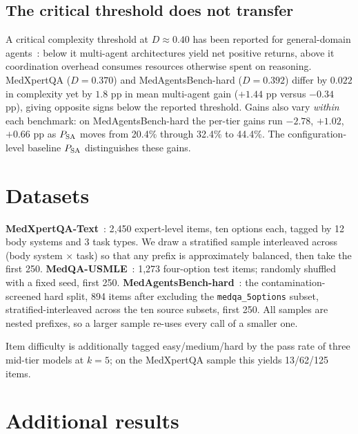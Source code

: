 \begin{table}[t]\centering\small
\caption{\textbf{Domain complexity of the three benchmarks.} Bold $D$ averages the performance ceiling, relative spread and best-model baseline; mean multi-agent gain is in pp.}
\label{tab:complexity}

\end{table}

\subsection{The critical threshold does not transfer}
A critical complexity threshold at $D \approx 0.40$ has been reported for general-domain
agents~\citep{kim2026scaling}: below it
multi-agent architectures yield net positive returns, above it coordination overhead consumes
resources otherwise spent on reasoning. MedXpertQA ($D = 0.370$) and MedAgentsBench-hard ($D = 0.392$) differ by $0.022$ in
complexity yet by $1.8$ pp in mean multi-agent gain ($+1.44$ pp versus $-0.34$ pp), giving
opposite signs below the reported threshold. Gains also vary \emph{within} each benchmark: on MedAgentsBench-hard the
per-tier gains run $-2.78$, $+1.02$, $+0.66$ pp as $P_{\mathrm{SA}}$ moves from 20.4\% through 32.4\% to
44.4\%. The configuration-level baseline $P_{\mathrm{SA}}$ distinguishes these gains.

\section{Datasets}
\label{app:data}

\textbf{MedXpertQA-Text}~\citep{zuo2025medxpertqa}: 2{,}450 expert-level items, ten options each,
tagged by 12 body systems and 3 task types. We draw a stratified sample interleaved across
(body system $\times$ task) so that any prefix is approximately balanced, then take the first 250.
\textbf{MedQA-USMLE}~\citep{jin2021medqa}: 1{,}273 four-option test items; randomly shuffled with a
fixed seed, first 250. \textbf{MedAgentsBench-hard}~\citep{medagentsbench}: the
contamination-screened hard split, 894 items after excluding the \texttt{medqa\_5options} subset,
stratified-interleaved across the ten source subsets, first 250. All samples are nested prefixes,
so a larger sample re-uses every call of a smaller one.

Item difficulty is additionally tagged easy/medium/hard by the pass rate of three mid-tier models
at $k{=}5$; on the MedXpertQA sample this yields 13/62/125 items.

\section{Additional results}
\label{app:extra}

